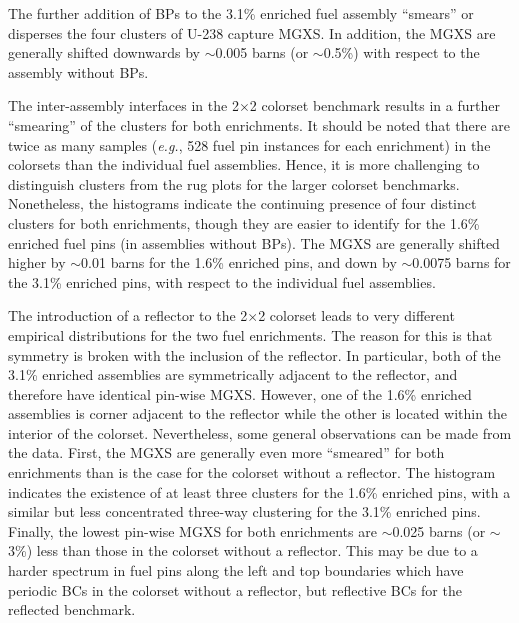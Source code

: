 \noindent The further addition of \acp{BP} to the 3.1\% enriched fuel assembly ``smears'' or disperses the four clusters of U-238 capture \ac{MGXS}. In addition, the \ac{MGXS} are generally shifted downwards by $\sim$0.005 barns (or $\sim$0.5\%) with respect to the assembly without \acp{BP}.

The inter-assembly interfaces in the 2$\times$2 colorset benchmark results in a further ``smearing'' of the clusters for both enrichments. It should be noted that there are twice as many samples (\textit{e.g.}, 528 fuel pin instances for each enrichment) in the colorsets than the individual fuel assemblies. Hence, it is more challenging to distinguish clusters from the rug plots for the larger colorset benchmarks. Nonetheless, the histograms indicate the continuing presence of four distinct clusters for both enrichments, though they are easier to identify for the 1.6\% enriched fuel pins (in assemblies without \acp{BP}). The \ac{MGXS} are generally shifted higher by $\sim$0.01 barns for the 1.6\% enriched pins, and down by $\sim$0.0075 barns for the 3.1\% enriched pins, with respect to the individual fuel assemblies.

The introduction of a reflector to the 2$\times$2 colorset leads to very different empirical distributions for the two fuel enrichments. The reason for this is that symmetry is broken with the inclusion of the reflector. In particular, both of the 3.1\% enriched assemblies are symmetrically adjacent to the reflector, and therefore have identical pin-wise \ac{MGXS}. However, one of the 1.6\% enriched assemblies is corner adjacent to the reflector while the other is located within the interior of the colorset. Nevertheless, some general observations can be made from the data. First, the \ac{MGXS} are generally even more ``smeared'' for both enrichments than is the case for the colorset without a reflector. The histogram indicates the existence of at least three clusters for the 1.6\% enriched pins, with a similar but less concentrated three-way clustering for the 3.1\% enriched pins. Finally, the lowest pin-wise \ac{MGXS} for both enrichments are $\sim$0.025 barns (or $\sim$3\%) less than those in the colorset without a reflector. This may be due to a harder spectrum in fuel pins along the left and top boundaries which have periodic \acp{BC} in the colorset without a reflector, but reflective \acp{BC} for the reflected benchmark.


